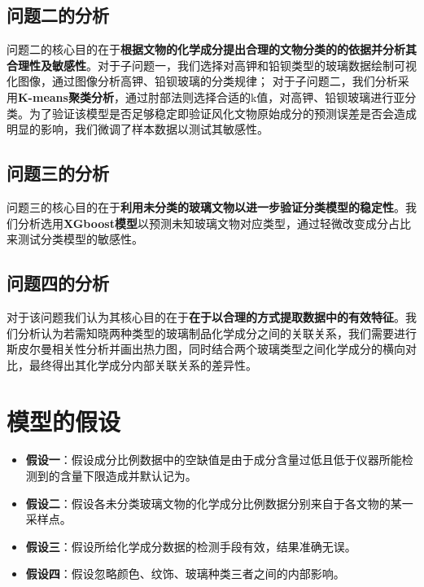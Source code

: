 \documentclass{MathModeling}
\begin{document}
	\subsection{问题二的分析}
	问题二的核心目的在于{\textbf{根据文物的化学成分提出合理的文物分类的的依据并分析其合理性及敏感性}}。{\heiti 对于子问题一}，我们选择对高钾和铅钡类型的玻璃数据绘制可视化图像，通过图像分析高钾、铅钡玻璃的分类规律；
	{\heiti 对于子问题二}，我们分析采用{\textbf{K-means聚类分析}}，通过肘部法则选择合适的k值，对高钾、铅钡玻璃进行亚分类。为了验证该模型是否足够稳定即{\heiti 验证风化文物原始成分的预测误差是否会造成明显的影响}，我们微调了样本数据以测试其敏感性。

	\subsection{问题三的分析}
	问题三的核心目的在于{\textbf{利用未分类的玻璃文物以进一步验证分类模型的稳定性}}。我们分析选用{\textbf{XGboost模型}}以预测未知玻璃文物对应类型，通过轻微改变成分占比来测试分类模型的敏感性。


	\subsection{问题四的分析}
	对于该问题我们认为其核心目的在于{\textbf{在于以合理的方式提取数据中的有效特征}}。我们分析认为若需知晓两种类型的玻璃制品化学成分之间的关联关系，我们需要进行{\heiti 斯皮尔曼相关性分析}并画出热力图，同时结合两个玻璃类型之间化学成分的横向对比，最终得出其化学成分内部关联关系的差异性。
	
	\section{模型的假设}
	\begin{itemize}
		\item \textbf{假设一}：假设成分比例数据中的空缺值是由于成分含量过低且低于仪器所能检测到的含量下限造成并默认记为{}。
		\item \textbf{假设二}：假设各未分类玻璃文物的化学成分比例数据分别来自于各文物的某一采样点。
		\item \textbf{假设三}：假设所给化学成分数据的检测手段有效，结果准确无误。
		\item \textbf{假设四}：假设忽略颜色、纹饰、玻璃种类三者之间的内部影响。
	\end{itemize}
\end{document}
